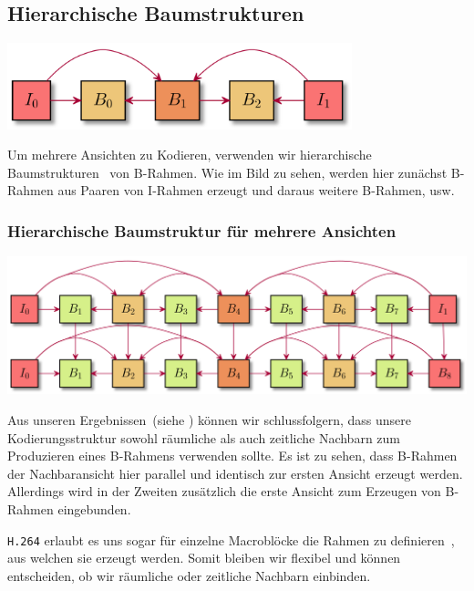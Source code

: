 \subsection{Hierarchische Baumstrukturen}\label{subsec:htrees}

\begin{center}
    \includegraphics[width=0.75\textwidth]{../img/b-pictures}
\end{center}

\noindent Um mehrere Ansichten zu Kodieren, verwenden wir hierarchische Baumstrukturen~\cite{hier-b-frames} von B-Rahmen.
Wie im Bild zu sehen, werden hier zun\"achst B-Rahmen aus Paaren von I-Rahmen erzeugt und daraus weitere B-Rahmen, usw.


\subsubsection{Hierarchische Baumstruktur f\"ur mehrere Ansichten}
\begin{center}
    \includegraphics[width=1\textwidth]{../img/b-pictures-3d}
\end{center}
Aus unseren Ergebnissen~(siehe \textit{}) k\"onnen wir schlussfolgern, dass unsere Kodierungsstruktur
sowohl r\"aumliche als auch zeitliche Nachbarn zum Produzieren eines B-Rahmens verwenden sollte.
Es ist zu sehen, dass B-Rahmen der Nachbaransicht hier parallel und identisch zur ersten Ansicht erzeugt werden.
Allerdings wird in der Zweiten zus\"atzlich die erste Ansicht zum Erzeugen von B-Rahmen eingebunden.

\noindent\newline \texttt{H.264} erlaubt es uns sogar f\"ur einzelne Macrobl\"ocke die Rahmen zu definieren~\cite{h264},
aus welchen sie erzeugt werden.
Somit bleiben wir flexibel und k\"onnen entscheiden, ob wir r\"aumliche oder zeitliche Nachbarn einbinden.

